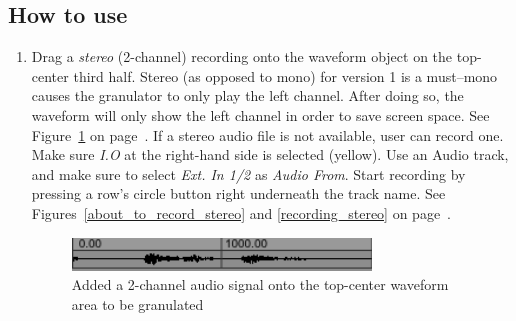 \documentclass{article}
\begin{document}
		\subsection{How to use}
			\begin{enumerate}
				\item Drag a \emph{stereo} (2-channel) recording onto the waveform object on the top-center third half. Stereo (as opposed to mono) for version 1 is a must--mono causes the granulator to only play the left channel. After doing so, the waveform will only show the left channel in order to save screen space. See Figure~\ref{add_2_channel_audio_to_granulate} on page~\pageref{add_2_channel_audio_to_granulate}.
				If a stereo audio file is not available, user can record one. Make sure \emph{I.O} at the right-hand side is selected (yellow). Use an Audio track, and make sure to select \emph{Ext. In 1/2} as \emph{Audio From}. Start recording by pressing a row's circle button right underneath the track name.  See Figures~\ref{about_to_record_stereo} and \ref{recording_stereo} on page~\pageref{recording a stereo signal}.

				\begin{figure}[h!]
				  \centering
			    \includegraphics[width=0.75\textwidth]{images/granulator_waveform_fresh}
				  \caption{Added a 2-channel audio signal onto the top-center waveform area to be granulated}
				  \label{add_2_channel_audio_to_granulate}
				\end{figure}


\end{enumerate}
\end{document}
